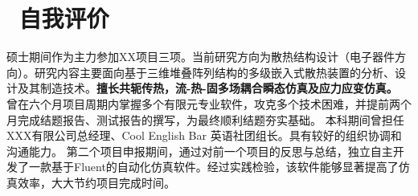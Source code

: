 \documentclass[a4paper,11pt]{ctexart}
\begin{document}
\section{\texorpdfstring{\faUserEdit\,}{} 自我评价}

  \resumeItemListStart
    {硕士期间作为主力参加XX项目三项。当前研究方向为散热结构设计（电子器件方向）。研究内容主要面向基于三维堆叠阵列结构的多级嵌入式散热装置的分析、设计及其制造技术。\textbf{擅长共轭传热，流-热-固多场耦合瞬态仿真及应力应变仿真。}}
    {曾在六个月项目周期内掌握多个有限元专业软件，攻克多个技术困难，并提前两个月完成结题报告、测试报告的撰写，为最终顺利结题夯实基础。}
    {本科期间曾担任XXX有限公司总经理、Cool English Bar 英语社团组长。具有较好的组织协调和沟通能力。}
    {第二个项目申报期间，通过对前一个项目的反思与总结，独立自主开发了一款基于Fluent的自动化仿真软件。经过实践检验，该软件能够显著提高了仿真效率，大大节约项目完成时间。}
  \resumeItemListEnd
\vspace{-4mm}
\vfill
{}
\end{document}
